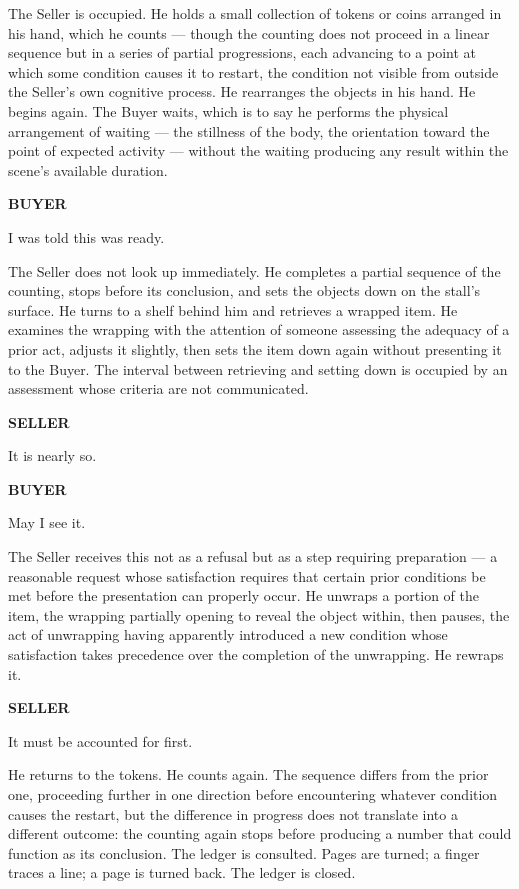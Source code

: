 \documentclass[12pt, oneside]{article}
\newenvironment{action}{%
  \vspace{0.6em}%
  \noindent\ignorespaces%
}{%
  \par\vspace{0.6em}%
}
\newcommand{\character}[1]{%
  \vspace{0.8em}%
  \begin{center}%
    \bfseries\MakeUppercase{#1}%
  \end{center}%
  \vspace{-0.3em}%
}
\newenvironment{dialogue}{%
  \vspace{0.2em}%
  \begin{list}{}{%
    \setlength{\leftmargin}{1.2in}%
    \setlength{\rightmargin}{0.8in}%
    \setlength{\itemsep}{0.6em}%
    \setlength{\parsep}{0pt}%
  }%
}{%
  \end{list}%
  \vspace{0.4em}%
}
\newcommand{\says}[2]{%
  \character{#1}%
  \begin{dialogue}\item #2\end{dialogue}%
}
\begin{document}
\begin{action}
The Seller is occupied. He holds a small collection of tokens or coins arranged in his hand, which he counts --- though the counting does not proceed in a linear sequence but in a series of partial progressions, each advancing to a point at which some condition causes it to restart, the condition not visible from outside the Seller's own cognitive process. He rearranges the objects in his hand. He begins again. The Buyer waits, which is to say he performs the physical arrangement of waiting --- the stillness of the body, the orientation toward the point of expected activity --- without the waiting producing any result within the scene's available duration.
\end{action}

\says{Buyer}{I was told this was ready.}

\begin{action}
The Seller does not look up immediately. He completes a partial sequence of the counting, stops before its conclusion, and sets the objects down on the stall's surface. He turns to a shelf behind him and retrieves a wrapped item. He examines the wrapping with the attention of someone assessing the adequacy of a prior act, adjusts it slightly, then sets the item down again without presenting it to the Buyer. The interval between retrieving and setting down is occupied by an assessment whose criteria are not communicated.
\end{action}

\says{Seller}{It is nearly so.}

\says{Buyer}{May I see it.}

\begin{action}
The Seller receives this not as a refusal but as a step requiring preparation --- a reasonable request whose satisfaction requires that certain prior conditions be met before the presentation can properly occur. He unwraps a portion of the item, the wrapping partially opening to reveal the object within, then pauses, the act of unwrapping having apparently introduced a new condition whose satisfaction takes precedence over the completion of the unwrapping. He rewraps it.
\end{action}

\says{Seller}{It must be accounted for first.}

\begin{action}
He returns to the tokens. He counts again. The sequence differs from the prior one, proceeding further in one direction before encountering whatever condition causes the restart, but the difference in progress does not translate into a different outcome: the counting again stops before producing a number that could function as its conclusion. The ledger is consulted. Pages are turned; a finger traces a line; a page is turned back. The ledger is closed.
\end{action}
\end{document}

